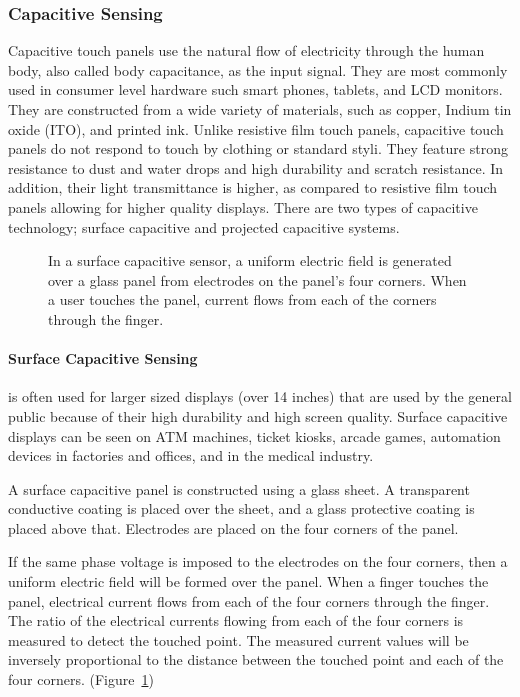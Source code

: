 \subsubsection{Capacitive Sensing}
Capacitive touch panels use the natural flow of electricity through the human body, also called body capacitance, as the input signal.
They are most commonly used in consumer level hardware such smart phones, tablets, and LCD monitors.
They are constructed from a wide variety of materials, such as copper, Indium tin oxide (ITO), and printed ink.
Unlike resistive film touch panels, capacitive touch panels do not respond to touch by clothing or standard styli.
They feature strong resistance to dust and water drops and high durability and scratch resistance. 
In addition, their light transmittance is higher, as compared to resistive film touch panels allowing for higher quality displays.
There are two types of capacitive technology; surface capacitive and projected capacitive systems.
 
\begin{center}
\begin{figure}
\caption[A diagram of a surface capacitive sensor]{In a surface capacitive sensor, a uniform electric field is generated over a glass panel from electrodes on the panel's four corners. When a user touches the panel, current flows from each of the corners through the finger.  \cite{touchtech}}
\label{fig:surcap}
\end{figure}
\end{center}

\paragraph{Surface Capacitive Sensing}

is often used for larger sized displays (over 14 inches) that are used by the general public because of their high durability and high screen quality.
Surface capacitive displays can be seen on ATM machines, ticket kiosks, arcade games, automation devices in factories and offices, and in the medical industry.

A surface capacitive panel is constructed using a glass sheet. 
A transparent conductive coating is placed over the sheet, and a glass protective coating is placed above that. 
Electrodes are placed on the four corners of the panel. 

If the same phase voltage is imposed to the electrodes on the four corners, then a uniform electric field will be formed over the panel. 
When a finger touches the panel, electrical current flows from each of the four corners through the finger. 
The ratio of the electrical currents flowing from each of the four corners is measured to detect the touched point. 
The measured current values will be inversely proportional to the distance between the touched point and each of the four corners. (Figure~\ref{fig:surcap})

